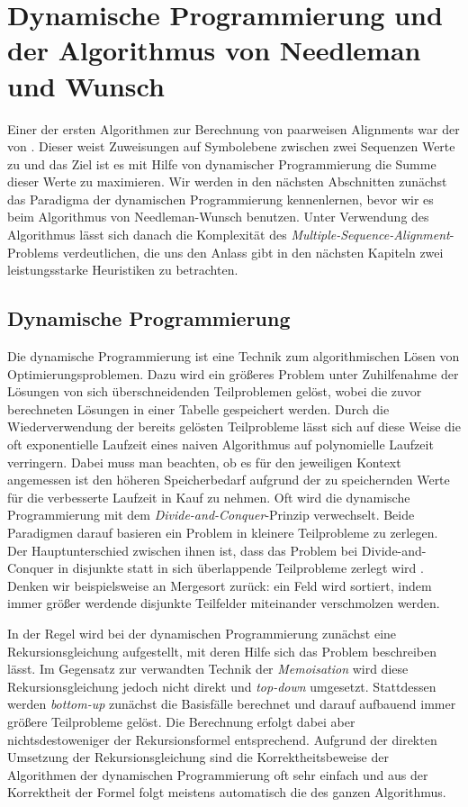 \chapter{Dynamische Programmierung und der Algorithmus von Needleman und Wunsch}
\label{ch:Dynamische Programmierung}

Einer der ersten Algorithmen zur Berechnung von paarweisen Alignments war der von \cite{nw70}. Dieser weist Zuweisungen auf Symbolebene zwischen zwei Sequenzen Werte zu und das Ziel ist es mit Hilfe von dynamischer Programmierung die Summe dieser Werte zu maximieren. Wir werden in den nächsten Abschnitten zunächst das Paradigma der dynamischen Programmierung kennenlernen, bevor wir es beim Algorithmus von Needleman-Wunsch benutzen. Unter Verwendung des Algorithmus lässt sich danach die Komplexität des \emph{Multiple-Sequence-Alignment}-Problems verdeutlichen, die uns den Anlass gibt in den nächsten Kapiteln zwei leistungsstarke Heuristiken zu betrachten.

\section{Dynamische Programmierung}

Die dynamische Programmierung ist eine Technik zum algorithmischen Lösen von Optimierungsproblemen. Dazu wird ein größeres Problem unter Zuhilfenahme der Lösungen von sich überschneidenden Teilproblemen gelöst, wobei die zuvor berechneten Lösungen in einer Tabelle gespeichert werden. Durch die Wiederverwendung der bereits gelösten Teilprobleme lässt sich auf diese Weise die oft exponentielle Laufzeit eines naiven Algorithmus auf polynomielle Laufzeit verringern. Dabei muss man beachten, ob es für den jeweiligen Kontext angemessen ist den höheren Speicherbedarf aufgrund der zu speichernden Werte für die verbesserte Laufzeit in Kauf zu nehmen. Oft wird die dynamische Programmierung mit dem \emph{Divide-and-Conquer}-Prinzip verwechselt. Beide Paradigmen darauf basieren ein Problem in kleinere Teilprobleme zu zerlegen. Der Hauptunterschied zwischen ihnen ist, dass das Problem bei Divide-and-Conquer in disjunkte statt in sich überlappende Teilprobleme zerlegt wird \cite[S.359]{clrs09}. Denken wir beispielsweise an Mergesort zurück: ein Feld wird sortiert, indem immer größer werdende disjunkte Teilfelder miteinander verschmolzen werden.

In der Regel wird bei der dynamischen Programmierung zunächst eine Rekursionsgleichung aufgestellt, mit deren Hilfe sich das Problem beschreiben lässt. Im Gegensatz zur verwandten Technik der \emph{Memoisation} wird diese Rekursionsgleichung jedoch nicht direkt und \emph{top-down} umgesetzt. Stattdessen werden \emph{bottom-up} zunächst die Basisfälle berechnet und darauf aufbauend immer größere Teilprobleme gelöst. Die Berechnung erfolgt dabei aber nichtsdestoweniger der Rekursionsformel entsprechend. Aufgrund der direkten Umsetzung der Rekursionsgleichung sind die Korrektheitsbeweise der Algorithmen der dynamischen Programmierung oft sehr einfach und aus der Korrektheit der Formel folgt meistens automatisch die des ganzen Algorithmus.

